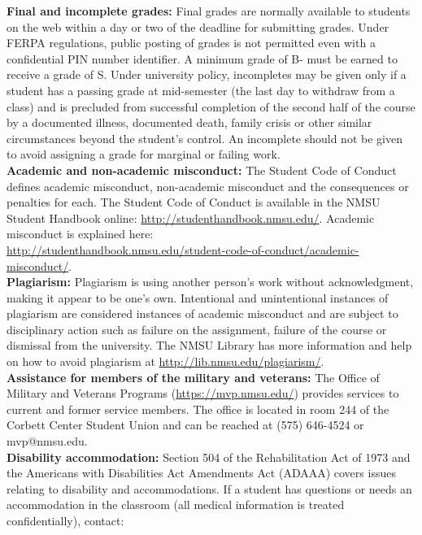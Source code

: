 \documentclass{article}
\begin{document}
\noindent\textbf{Final and incomplete grades:} Final grades are normally available to students on the web within a day or two of the deadline for submitting grades. Under FERPA regulations, public posting of grades is not permitted even with a confidential PIN number identifier. A minimum grade of B- must be earned to receive a grade of S. Under university policy, incompletes may be given only if a student has a passing grade at mid-semester (the last day to withdraw from a class) and is precluded from successful completion of the second half of the course by a documented illness, documented death, family crisis or other similar circumstances beyond the student's control. An incomplete should not be given to avoid assigning a grade for marginal or failing work. \\

\noindent\textbf{Academic and non-academic misconduct:}
The Student Code of Conduct defines academic misconduct, non-academic misconduct and the consequences or penalties for each.  The Student Code of Conduct is available in the NMSU Student Handbook online:  \url{http://studenthandbook.nmsu.edu/}. Academic misconduct is explained here: \\ \url{http://studenthandbook.nmsu.edu/student-code-of-conduct/academic-misconduct/}. \\

\noindent\textbf{Plagiarism:} Plagiarism is using another person's work without acknowledgment, making it appear to be one's own. Intentional and unintentional instances of plagiarism are considered instances of academic misconduct and are subject to disciplinary action such as failure on the assignment, failure of the course or dismissal from the university. The NMSU Library has more information and help on how to avoid plagiarism at \url{http://lib.nmsu.edu/plagiarism/}. \\

\noindent\textbf{Assistance for members of the military and veterans:} The Office of Military and Veterans Programs (\url{https://mvp.nmsu.edu/}) provides services to current and former service members.  The office is located in room 244 of the Corbett Center Student Union and can be reached at (575) 646-4524 or mvp@nmsu.edu. \\

\noindent\textbf{Disability accommodation:} Section 504 of the Rehabilitation Act of 1973 and the Americans with Disabilities Act Amendments Act (ADAAA) covers issues relating to disability and accommodations. If a student has questions or needs an accommodation in the classroom (all medical information is treated confidentially), contact:\\
\end{document}
